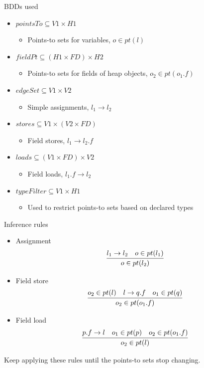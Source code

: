 \documentclass{beamer}
\begin{document}
\begin{frame}{BDDs used}
\begin{itemize}
\item $pointsTo \subseteq V1 \times H1$
  \begin{itemize} \item Points-to sets for variables, $o \in pt(l)$ \end{itemize}
\item $fieldPt \subseteq (H1 \times FD) \times H2$
  \begin{itemize} \item Points-to sets for fields of heap objects, $o_2 \in pt(o_1.f)$ \end{itemize}
\item $edgeSet \subseteq V1 \times V2$ 
  \begin{itemize} \item Simple assignments, $l_1 \rightarrow l_2$ \end{itemize}
\item $stores \subseteq V1 \times (V2 \times FD)$
  \begin{itemize} \item Field stores, $l_1 \rightarrow l_2.f$ \end{itemize}
\item $loads \subseteq (V1 \times FD) \times V2$
  \begin{itemize} \item Field loads, $l_1.f \rightarrow l_2$ \end{itemize}
\item $typeFilter \subseteq V1 \times H1$
  \begin{itemize} \item Used to restrict points-to sets based on declared types \end{itemize}
\end{itemize}
\end{frame}

\begin{frame}{Inference rules}
\begin{itemize}
\item Assignment \\
$$
\infer{o \in pt(l_2)}{l_1 \rightarrow l_2 & o \in pt(l_1)}
$$ 
\item Field store \\
$$
\infer{o_2 \in pt(o_1.f)}{o_2 \in pt(l) & l \rightarrow q.f & o_1 \in pt(q)}
$$
\item Field load \\
$$
\infer{o_2 \in pt(l)}{p.f \rightarrow l & o_1 \in pt(p) & o_2 \in pt(o_1.f)}
$$
\end{itemize}
Keep applying these rules until the points-to sets stop changing.
\end{frame}  
\end{document}
